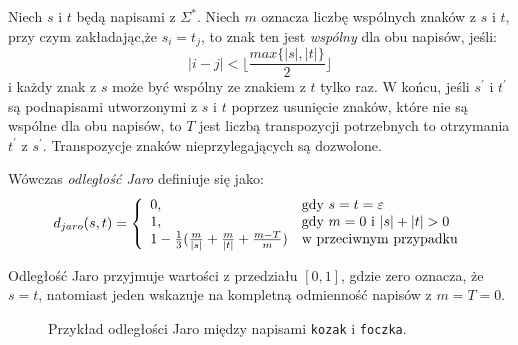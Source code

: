 \documentclass{praca1}
\begin{document}
\begin{definition}
Niech $s$ i $t$ będą napisami z $\Sigma^*$. Niech $m$ oznacza liczbę wspólnych znaków z $s$ i $t$, przy czym zakładając,że $s_i = t_j$, to znak ten jest \emph{wspólny} dla obu napisów, jeśli:
\begin{equation*}
|i -j| < \Bigg\lfloor\frac{max\{|s|, |t|\}}{2}\Bigg\rfloor
\end{equation*}
i każdy znak z $s$ może być wspólny ze znakiem z $t$ tylko raz. W końcu, jeśli $s^\prime$ i $t^\prime$ są podnapisami utworzonymi z $s$ i $t$ poprzez usunięcie znaków, które nie są wspólne dla obu napisów, to $T$ jest liczbą transpozycji potrzebnych to otrzymania $t^\prime$ z $s^\prime$. Transpozycje znaków nieprzylegających są dozwolone.

Wówczas \emph{odległość Jaro} definiuje się jako:
\begin{equation}
\label{eq:011}
d_{jaro}(s,t) = \left\{
\begin{array}{l l}     
    0, & \text{gdy } s = t = \varepsilon \\
    1, & \text{gdy } m = 0 \text{ i } |s| + |t| > 0 \\
    1 - \frac{1}{3} (\frac{m}{|s|} + \frac{m}{|t|} + \frac{m - T}{m}) & \text{w przeciwnym przypadku}
\end{array}\right.
\end{equation}
\end{definition}

Odległość Jaro przyjmuje wartości z przedziału $[0,1]$, gdzie zero oznacza, że $s = t$, natomiast jeden wskazuje na kompletną odmienność napisów z $m = T = 0$.


\begin{figure}[width=80pt]
\centering
{}
\cprotect\caption{Przykład odległości Jaro między napisami \verb|kozak| i \verb|foczka|.}\label{rys:005}
\end{figure}
\end{document}
